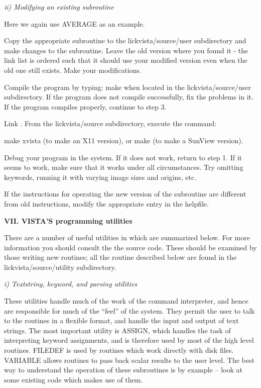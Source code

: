\Sskip
\centerline {\it ii) Modifying an existing subroutine\rm}

\vskip 0.125in
	Here we again use AVERAGE as an example.

\hang
{}Copy the appropriate subroutine to
the lickvista/source/user subdirectory and make changes to the
subroutine. Leave the old version where you found it - the link list
is ordered such that it should use your modified version even when the
old one still exists. Make your modifications.

\hang
{}Compile the program by typing: make
when located in the lickvista/source/user subdirectory.
If the program does not compile successfully, fix the 
problems in it. If the program compiles properly, continue to step 3. 

\hang
{}Link \Vns.  From the lickvista/source
subdirectory, execute the command:

\yyskip
	make xvista   (to make an X11 version), or
	make          (to make a SunView version).

\hang
{}Debug your program in the \V system. 
If it does not work, return to step 1. 
If it seems to
work, make sure that it works under all circumstances. Try omitting
keywords, running it with varying image sizes and origins, etc. 

\yyskip
\hang
{}If the instructions for operating the
new version of the subroutine are different from old instructions,
modify the appropriate entry in the helpfile. 

\vskip 0.125in
\Sskip
\centerline {\bf VII. VISTA'S programming utilities\rm}

\vskip 0.125in
There are a number of useful utilities in \V which are
summarized below. For more information you should consult the the
source code. These should be examined by those writing new
routines; all the routine described below are found in the
lickvista/source/utility subdirectory. 

\Sskip
\centerline  {\it i) Textstring, keyword, and parsing utilities\rm}

\vskip 0.125in
	These utilities handle much of the work of the \V command
interpreter, and hence are responsible for much of the ``feel'' of the
system.  They permit the user to talk to the routines in a flexible
format, and handle the input and output of text strings. The most
important utility is ASSIGN, which handles the task of interpreting
keyword assignments, and is therefore used by most of the high level
routines.  FILEDEF is used by routines which work directly with disk
files.  VARIABLE allows routines to pass back scalar results to the
user level.  The best way to understand the operation of these subroutines
is by example -- look at some existing code which makes use of them.


